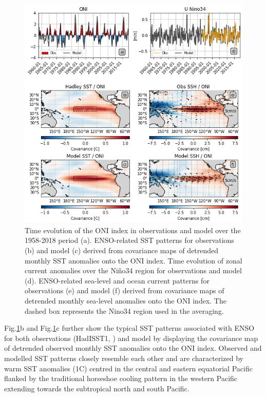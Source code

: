 \begin{figure}[h!tp]
	\centering
	\includegraphics[scale=0.6]{figs/fig1.png}
	\caption{Time evolution of the ONI index in observations and model over the 1958-2018 period (a). ENSO-related SST patterns for observations \citep{raynerGlobalAnalysesSea2003} (b) and model (c) derived from covariance maps of detrended monthly SST anomalies onto the ONI index. Time evolution of zonal current anomalies over the Niño34 region for observations \citep{rioGOCEOceanCirculation2014} and model (d). ENSO-related sea-level and ocean current patterns for observations (e) and model (f) derived from covariance maps of detrended monthly sea-level anomalies onto the ONI index. The dashed box represents the Nino34 region used in the averaging.}
	\label{fig:nemo-had-sst}
\end{figure}

Fig.\ref{fig:nemo-had-sst}b and Fig.\ref{fig:nemo-had-sst}c further show the typical SST patterns associated with ENSO for both observations (HadISST1, \citealp{raynerGlobalAnalysesSea2003}) and model by displaying the covariance map of detrended observed monthly SST anomalies onto the ONI index. Observed and modelled SST patterns closely resemble each other and are characterized by warm SST anomalies (1\degree{}C) centred in the central and eastern equatorial Pacific  flanked by the traditional horseshoe cooling pattern in the western Pacific extending towards the subtropical north and south Pacific.    


